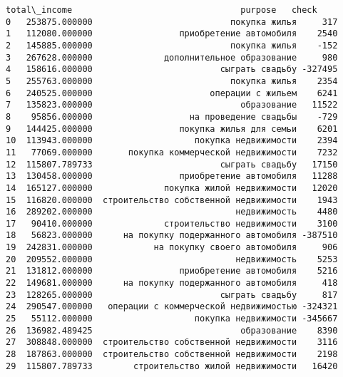 \documentclass[11pt]{article}
\begin{document}
\begin{tcolorbox}[breakable, boxrule=.5pt, size=fbox, pad at break*=1mm, opacityfill=0]
\begin{Verbatim}[commandchars=\\\{\}]
     total\_income                                 purpose   check
0   253875.000000                           покупка жилья     317
1   112080.000000                 приобретение автомобиля    2540
2   145885.000000                           покупка жилья    -152
3   267628.000000              дополнительное образование     980
4   158616.000000                         сыграть свадьбу -327495
5   255763.000000                           покупка жилья    2354
6   240525.000000                       операции с жильем    6241
7   135823.000000                             образование   11522
8    95856.000000                   на проведение свадьбы    -729
9   144425.000000                 покупка жилья для семьи    6201
10  113943.000000                    покупка недвижимости    2394
11   77069.000000       покупка коммерческой недвижимости    7232
12  115807.789733                         сыграть свадьбу   17150
13  130458.000000                 приобретение автомобиля   11288
14  165127.000000              покупка жилой недвижимости   12020
15  116820.000000  строительство собственной недвижимости    1943
16  289202.000000                            недвижимость    4480
17   90410.000000              строительство недвижимости    3100
18   56823.000000      на покупку подержанного автомобиля -387510
19  242831.000000            на покупку своего автомобиля     906
20  209552.000000                            недвижимость    5253
21  131812.000000                 приобретение автомобиля    5216
22  149681.000000      на покупку подержанного автомобиля     418
23  128265.000000                         сыграть свадьбу     817
24  290547.000000   операции с коммерческой недвижимостью -324321
25   55112.000000                    покупка недвижимости -345667
26  136982.489425                             образование    8390
27  308848.000000  строительство собственной недвижимости    3116
28  187863.000000  строительство собственной недвижимости    2198
29  115807.789733        строительство жилой недвижимости   16420
\end{Verbatim}
\end{tcolorbox}
        
\end{document}
